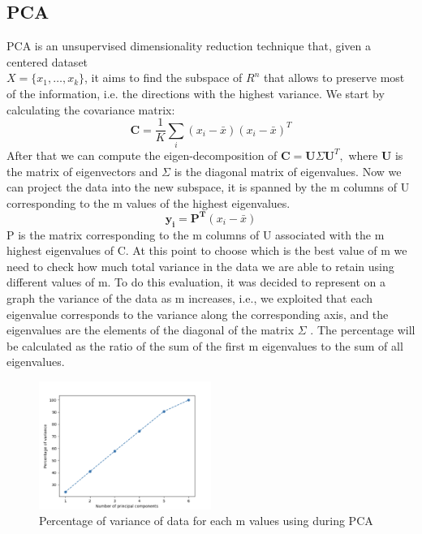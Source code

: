 \documentclass{article}
\begin{document}
\subsection{PCA}
PCA is an unsupervised dimensionality reduction technique that, given a centered dataset \\\(X = \{x_1, \ldots, x_k\}\), it aims to find the subspace of \(R^n\) that allows to preserve most of the information, i.e. the directions with the highest variance.
We start by calculating the covariance matrix:
\begin{equation}
\mathbf{C} = \frac{1}{K} \sum_{i} (x_i - \bar{x})(x_i - \bar{x})^T
\end{equation}
After that we can compute the eigen-decomposition of \(
\mathbf{C} = \mathbf{U} \Sigma \mathbf{U}^T,
\)
where \( \mathbf{U} \) is the matrix of eigenvectors and \( \Sigma  \) is the diagonal matrix of eigenvalues. Now we can project the data into the new subspace, it is spanned by the m columns of U corresponding to the m values of the highest eigenvalues.\\
\begin{equation}
\mathbf{y_i} = \mathbf{P^T} (x_i - \bar{x})
\end{equation}
P is the matrix corresponding to the m columns of U associated with the m highest eigenvalues of C.
At this point to choose which is the best value of m we need to check how much total variance in the data we are able to retain using different values of m.
To do this evaluation, it was decided to represent on a graph the variance of the data as m increases, i.e., we exploited that each eigenvalue corresponds to the variance along the corresponding axis, and the eigenvalues are the elements of the diagonal of the matrix \(\Sigma\) . The percentage will be calculated as the ratio of the sum of the first m eigenvalues to the sum of all eigenvalues.
\begin{figure}[H]
    \centering
    \includegraphics[width=0.5\textwidth]{./img/variance.png}
    \caption{Percentage of variance of data for each m values using during PCA}
    \label{fig:variance}
\end{figure} 
\end{document}
